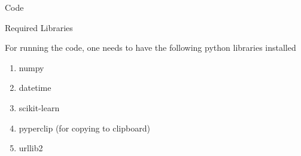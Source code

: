 \documentclass{article}
\begin{document}
\begin{question}
\begin{qsection}{Code}
		\begin{qsubsection}{Required Libraries}

			For running the code, one needs to have the following python libraries installed
			\begin{enumerate}
				\item numpy
				\item datetime
				\item scikit-learn
				\item pyperclip (for copying to clipboard)
				\item urllib2
			\end{enumerate}

		\end{qsubsection}

	\end{qsection}

\end{question}
\end{document}
